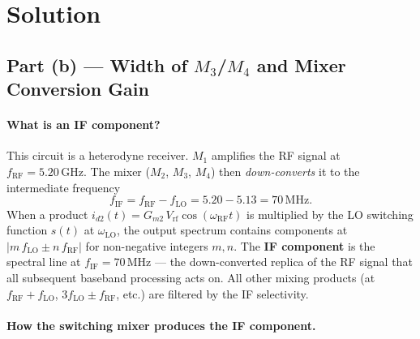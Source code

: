 \section*{Solution}

\subsection*{Part (b) — Width of $M_3$/$M_4$ and Mixer Conversion Gain}

\paragraph{What is an IF component?}

This circuit is a heterodyne receiver.  $M_1$ amplifies the RF signal at
$f_\text{RF} = 5.20\,\text{GHz}$.  The mixer ($M_2$, $M_3$, $M_4$) then
\emph{down-converts} it to the intermediate frequency
\[
  f_\text{IF} = f_\text{RF} - f_\text{LO} = 5.20 - 5.13 = 70\,\text{MHz}.
\]
When a product $i_{d2}(t) = G_{m2}\,V_\text{rf}\cos(\omega_\text{RF}t)$ is
multiplied by the LO switching function $s(t)$ at $\omega_\text{LO}$, the
output spectrum contains components at
$|m\,f_\text{LO} \pm n\,f_\text{RF}|$ for non-negative integers $m,n$.
The \textbf{IF component} is the spectral line at $f_\text{IF} = 70\,\text{MHz}$
--- the down-converted replica of the RF signal that all subsequent baseband
processing acts on.  All other mixing products (at $f_\text{RF}+f_\text{LO}$,
$3f_\text{LO}\pm f_\text{RF}$, etc.) are filtered by the IF selectivity.

\paragraph{How the switching mixer produces the IF component.}

